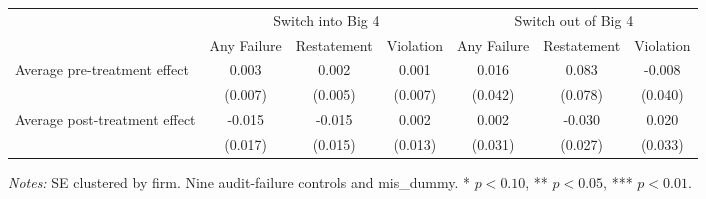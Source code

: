 \documentclass[10pt]{article}
\newcommand{\sym}[1]{\textsuperscript{#1}}
\begin{document}
\begin{minipage}{19cm}\fontsize{10}{12}\selectfont\setlength{\tabcolsep}{4pt}\renewcommand{\arraystretch}{1.15}


\def\sym#1{\ifmmode^{#1}\else\(^{#1}\)\fi}
\centering
{}
\label{tab:big4-eventstudy-csdid}
\begin{threeparttable}

\begin{tabular}{l c c c c c c }
\toprule
 & \multicolumn{3}{c}{Switch into Big 4} & \multicolumn{3}{c}{Switch out of Big 4} \\
\cmidrule(lr){2-4}\cmidrule(lr){5-7}
 & Any Failure & Restatement & Violation & Any Failure & Restatement & Violation \\
\midrule
Average pre-treatment effect & 0.003 & 0.002 & 0.001 & 0.016 & 0.083 & -0.008 \\
 & (0.007) & (0.005) & (0.007) & (0.042) & (0.078) & (0.040) \\
Average post-treatment effect & -0.015 & -0.015 & 0.002 & 0.002 & -0.030 & 0.020 \\
 & (0.017) & (0.015) & (0.013) & (0.031) & (0.027) & (0.033) \\
\bottomrule
\end{tabular}
\begin{tablenotes}\fontsize{9}{11}\selectfont
\item \raggedright \fontsize{9}{11}\selectfont \textit{Notes:} SE clustered by firm. Nine audit-failure controls and mis\_dummy. * $p<0.10$, ** $p<0.05$, *** $p<0.01$.
\end{tablenotes}
\end{threeparttable}

\end{minipage}
\end{document}
